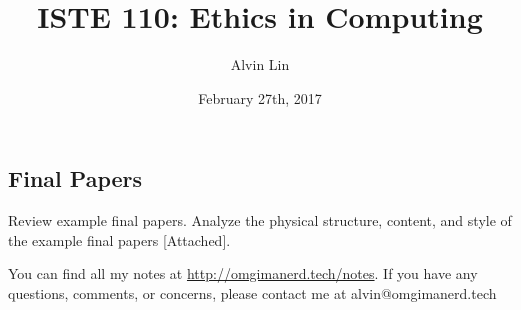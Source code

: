 \documentclass[letterpaper, 12pt]{article}
\title{ISTE 110: Ethics in Computing}
\author{Alvin Lin}
\date{February 27th, 2017}
\begin{document}
\maketitle

\subsection*{Final Papers}
Review example final papers. Analyze the physical structure, content, and style
of the example final papers [Attached].

\begin{center}
  You can find all my notes at \url{http://omgimanerd.tech/notes}. If you have
  any questions, comments, or concerns, please contact me at
  alvin@omgimanerd.tech
\end{center}
\end{document}
